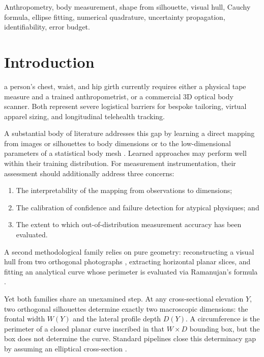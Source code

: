 \documentclass[journal]{IEEEtran}
\begin{document}
\begin{IEEEkeywords}
Anthropometry, body measurement, shape from silhouette, visual hull, Cauchy formula, ellipse fitting, numerical quadrature, uncertainty propagation, identifiability, error budget.
\end{IEEEkeywords}

\section{Introduction}
\label{sec:introduction}
 a person's chest, waist, and hip girth currently requires either a physical tape measure and a trained anthropometrist, or a commercial 3D optical body scanner. Both represent severe logistical barriers for bespoke tailoring, virtual apparel sizing, and longitudinal telehealth tracking. 

A substantial body of literature addresses this gap by learning a direct mapping from images or silhouettes to body dimensions or to the low-dimensional parameters of a statistical body mesh \cite{anguelov2005scape, loper2015smpl, dibra2016human, smith2019bodynet, ruiz2022bodym, skorvankova2023deep}. Learned approaches may perform well within their training distribution. For measurement instrumentation, their assessment should additionally address three concerns:
\begin{enumerate}
    \item The interpretability of the mapping from observations to dimensions;
    \item The calibration of confidence and failure detection for atypical physiques; and
    \item The extent to which out-of-distribution measurement accuracy has been evaluated.
\end{enumerate}

A second methodological family relies on pure geometry: reconstructing a visual hull from two orthogonal photographs \cite{laurentini1994visual, cheung2003shape}, extracting horizontal planar slices, and fitting an analytical curve whose perimeter is evaluated via Ramanujan's formula \cite{ramanujan1914modular}. 

Yet both families share an unexamined step. At any cross-sectional elevation $Y$, two orthogonal silhouettes determine exactly two macroscopic dimensions: the frontal width $W(Y)$ and the lateral profile depth $D(Y)$. A circumference is the perimeter of a closed planar curve inscribed in that $W \times D$ bounding box, but the box does not determine the curve. Standard pipelines close this determinacy gap by assuming an elliptical cross-section \cite{boisvert2008measurement, ramanujan1914modular}.
\end{document}
